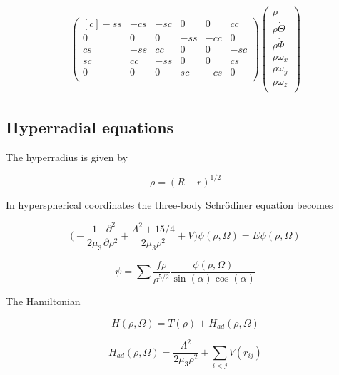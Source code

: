 \documentclass{article}
\begin{document}
\begin{align}
\begin{pmatrix*}[c]
       -ss & -cs & -sc & 0 & 0 & cc\\
       0 & 0 & 0 & -ss & -cc & 0\\
       cs & -ss & cc & 0 & 0 & -sc\\
       sc & cc & -ss & 0 & 0 & cs\\
       0 & 0 & 0 & sc & -cs & 0\\
     \end{pmatrix*}
     \begin{pmatrix}
     \dot{\rho}\\
     \rho \dot{\Theta}\\
     \rho \dot{\Phi}\\
     \rho \omega_x\\
     \rho \omega_y\\
     \rho \omega_z\\
     \end{pmatrix}
     \end{align}
     


\subsection{Hyperradial equations}

The hyperradius is given by

\begin{equation}
\rho = (R + r)^{1/2}
\end{equation}

In hyperspherical coordinates the three-body Schr{\"o}diner equation becomes

\begin{equation}
\Bigg(-\frac{1}{2 \mu_{3}}\frac{\partial^2}{ \partial \rho^2} + \frac{\Lambda^2 + 15/4}{2 \mu_{3} \rho^2} + V \Bigg)\psi(\rho,\Omega) = E\psi(\rho,\Omega)
\end{equation}

\begin{equation}
\psi = \sum \frac{f{\rho}}{\rho^{5/2}} \frac{\phi{(\rho,\Omega)}}{\sin(\alpha) \cos(\alpha)}
\end{equation}

The Hamiltonian

\begin{equation}
H(\rho,\Omega) = T(\rho) + H_{ad}(\rho,\Omega)
\end{equation}

\begin{equation}
H_{ad}(\rho,\Omega) = \frac{\Lambda^2}{2 \mu_{3} \rho^2} + \sum_{i<j} V(r_{ij})
\end{equation}
\end{document}
